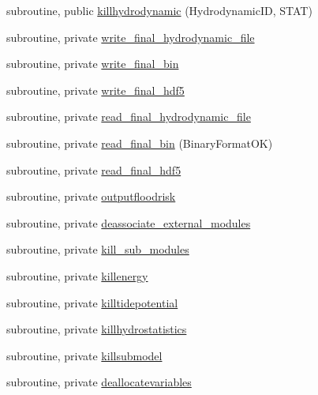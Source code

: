 \begin{DoxyCompactItemize}
\item 
subroutine, public \mbox{\hyperlink{namespacemodulehydrodynamic_a0f3d902c6ac5d0beab910d09d6037271}{killhydrodynamic}} (Hydrodynamic\+ID, S\+T\+AT)
\item 
subroutine, private \mbox{\hyperlink{namespacemodulehydrodynamic_a633e5bd5e4240a071e45a505396056eb}{write\+\_\+final\+\_\+hydrodynamic\+\_\+file}}
\item 
subroutine, private \mbox{\hyperlink{namespacemodulehydrodynamic_a5bdef2c140ebc772066fbee498f4cccb}{write\+\_\+final\+\_\+bin}}
\item 
subroutine, private \mbox{\hyperlink{namespacemodulehydrodynamic_af8baaec85d39b5b0c7ce04593a4ba674}{write\+\_\+final\+\_\+hdf5}}
\item 
subroutine, private \mbox{\hyperlink{namespacemodulehydrodynamic_aac2dc91eeafc8e79ef7e6399aca89537}{read\+\_\+final\+\_\+hydrodynamic\+\_\+file}}
\item 
subroutine, private \mbox{\hyperlink{namespacemodulehydrodynamic_a24c75082fcb309f40ebc8ab0a0493fc8}{read\+\_\+final\+\_\+bin}} (Binary\+Format\+OK)
\item 
subroutine, private \mbox{\hyperlink{namespacemodulehydrodynamic_a7e3a53d388991f1cae4f042edd8cc7fb}{read\+\_\+final\+\_\+hdf5}}
\item 
subroutine, private \mbox{\hyperlink{namespacemodulehydrodynamic_a98ea84afedb06cff0d55601f6e7b1494}{outputfloodrisk}}
\item 
subroutine, private \mbox{\hyperlink{namespacemodulehydrodynamic_a9ab4535ec430fb9f040e8027eab7128d}{deassociate\+\_\+external\+\_\+modules}}
\item 
subroutine, private \mbox{\hyperlink{namespacemodulehydrodynamic_ad33fcf640ab52de6097223c4aeb342c0}{kill\+\_\+sub\+\_\+modules}}
\item 
subroutine, private \mbox{\hyperlink{namespacemodulehydrodynamic_a85ec37a513035b769326676058893ac1}{killenergy}}
\item 
subroutine, private \mbox{\hyperlink{namespacemodulehydrodynamic_ab35b45e7f241087188692a17e57b81fe}{killtidepotential}}
\item 
subroutine, private \mbox{\hyperlink{namespacemodulehydrodynamic_a4ef7d15d1c97d54f708e71f1262485b0}{killhydrostatistics}}
\item 
subroutine, private \mbox{\hyperlink{namespacemodulehydrodynamic_a9b2046e58cfbfc36752c1c596ac76085}{killsubmodel}}
\item 
subroutine, private \mbox{\hyperlink{namespacemodulehydrodynamic_a97e376130dedc4213ae9f7bd331d237a}{deallocatevariables}}

\end{DoxyCompactItemize}
